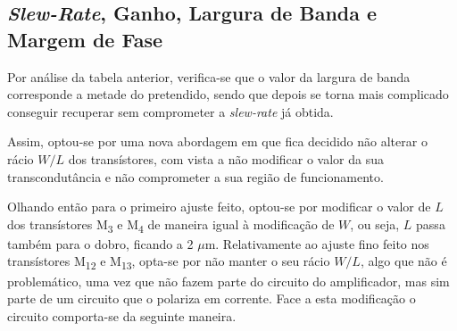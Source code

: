 \documentclass[11pt]{article}
\numberwithin{equation}{section}
\begin{document}
\subsection{\textit{Slew-Rate}, Ganho, Largura de Banda e Margem de Fase}

Por análise da tabela anterior, verifica-se que o valor da largura de banda corresponde a metade do pretendido, sendo que depois se torna mais complicado conseguir recuperar sem comprometer a \textit{slew-rate} já obtida. 

Assim, optou-se por uma nova abordagem em que fica decidido não alterar o rácio $W/L$ dos transístores, com vista a não modificar o valor da sua transcondutância e não comprometer a sua região de funcionamento.

Olhando então para o primeiro ajuste feito, optou-se por modificar o valor de $L$ dos transístores M\textsubscript{3} e M\textsubscript{4} de maneira igual à modificação de $W$, ou seja, $L$ passa também para o dobro, ficando a 2 $\mu$m. Relativamente ao ajuste fino feito nos transístores M\textsubscript{12} e M\textsubscript{13}, opta-se por não manter o seu rácio $W/L$, algo que não é problemático, uma vez que não fazem parte do circuito do amplificador, mas sim parte de um circuito que o polariza em corrente. Face a esta modificação o circuito comporta-se da seguinte maneira. 

\vspace{-2mm}
\end{document}
